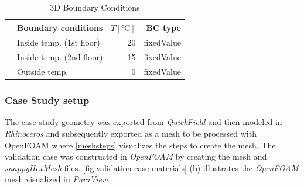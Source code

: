     \begin{table}[htb]
   
      \caption{3D Boundary Conditions}
      \centering
        \begin{tabular}{llrr}    
            \toprule   
            & Boundary conditions          & $T [\si{\degreeCelsius}]$           & BC type                   \\ 
            \midrule
            & Inside temp.  (1st floor)         & 20                          & fixedValue                \\
            & Inside temp.  (2nd floor)          & 15                          & fixedValue                \\
            & Outside temp.  & 0                          & fixedValue                \\ 
            \bottomrule
        \end{tabular}

\end{table}






\subsubsection{Case Study setup}
The case study geometry was exported from \textit{QuickField} and then modeled in \textit{Rhinoceros} and subsequently exported as a mesh to be processed with OpenFOAM where \ref{meshsteps} visualizes the steps to create the mesh. 
The validation case was constructed in \textit{OpenFOAM} by creating the mesh and \textit{snappyHexMesh} files.  
\ref{fig:validation-case-materials}  (b) illustrates the \textit{OpenFOAM} mesh visualized in \textit{ParaView}.
    

